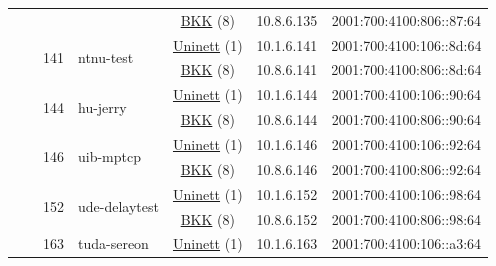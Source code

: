 \begin{small}
\begin{center}
\begin{longtable}{|c|c|c|c|c|c|c|c|}
  &  &  &  & \multicolumn{2}{|c|}{\tiny{\href{http://bkk.no}{BKK} (8)}} & \tiny{10.8.6.135} & \tiny{2001:700:4100:806::87:64} \\* \cline{3-3}\cline{4-4}\cline{5-5}\cline{6-6}\cline{7-7}\cline{8-8}
  &  & \multirow{2}{*}{\tiny{141}} & \multicolumn{1}{|l|}{\multirow{2}{*}{\tiny{ntnu-test}}} & \multicolumn{2}{|c|}{\tiny{\href{https://www.uninett.no}{Uninett} (1)}} & \tiny{10.1.6.141} & \tiny{2001:700:4100:106::8d:64} \\* \cline{5-5}\cline{6-6}\cline{7-7}\cline{8-8}
  &  &  &  & \multicolumn{2}{|c|}{\tiny{\href{http://bkk.no}{BKK} (8)}} & \tiny{10.8.6.141} & \tiny{2001:700:4100:806::8d:64} \\* \cline{3-3}\cline{4-4}\cline{5-5}\cline{6-6}\cline{7-7}\cline{8-8}
  &  & \multirow{2}{*}{\tiny{144}} & \multicolumn{1}{|l|}{\multirow{2}{*}{\tiny{hu-jerry}}} & \multicolumn{2}{|c|}{\tiny{\href{https://www.uninett.no}{Uninett} (1)}} & \tiny{10.1.6.144} & \tiny{2001:700:4100:106::90:64} \\* \cline{5-5}\cline{6-6}\cline{7-7}\cline{8-8}
  &  &  &  & \multicolumn{2}{|c|}{\tiny{\href{http://bkk.no}{BKK} (8)}} & \tiny{10.8.6.144} & \tiny{2001:700:4100:806::90:64} \\* \cline{3-3}\cline{4-4}\cline{5-5}\cline{6-6}\cline{7-7}\cline{8-8}
  &  & \multirow{2}{*}{\tiny{146}} & \multicolumn{1}{|l|}{\multirow{2}{*}{\tiny{uib-mptcp}}} & \multicolumn{2}{|c|}{\tiny{\href{https://www.uninett.no}{Uninett} (1)}} & \tiny{10.1.6.146} & \tiny{2001:700:4100:106::92:64} \\* \cline{5-5}\cline{6-6}\cline{7-7}\cline{8-8}
  &  &  &  & \multicolumn{2}{|c|}{\tiny{\href{http://bkk.no}{BKK} (8)}} & \tiny{10.8.6.146} & \tiny{2001:700:4100:806::92:64} \\* \cline{3-3}\cline{4-4}\cline{5-5}\cline{6-6}\cline{7-7}\cline{8-8}
  &  & \multirow{2}{*}{\tiny{152}} & \multicolumn{1}{|l|}{\multirow{2}{*}{\tiny{ude-delaytest}}} & \multicolumn{2}{|c|}{\tiny{\href{https://www.uninett.no}{Uninett} (1)}} & \tiny{10.1.6.152} & \tiny{2001:700:4100:106::98:64} \\* \cline{5-5}\cline{6-6}\cline{7-7}\cline{8-8}
  &  &  &  & \multicolumn{2}{|c|}{\tiny{\href{http://bkk.no}{BKK} (8)}} & \tiny{10.8.6.152} & \tiny{2001:700:4100:806::98:64} \\* \cline{3-3}\cline{4-4}\cline{5-5}\cline{6-6}\cline{7-7}\cline{8-8}
  &  & \multirow{2}{*}{\tiny{163}} & \multicolumn{1}{|l|}{\multirow{2}{*}{\tiny{tuda-sereon}}} & \multicolumn{2}{|c|}{\tiny{\href{https://www.uninett.no}{Uninett} (1)}} & \tiny{10.1.6.163} & \tiny{2001:700:4100:106::a3:64} \\* \cline{5-5}\cline{6-6}\cline{7-7}\cline{8-8}

\end{longtable}
\end{center}
\end{small}
